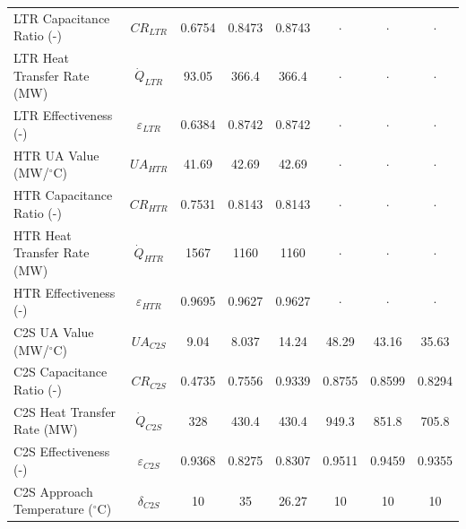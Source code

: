\begin{paracol}{2}
\begin{specialtable}[H]
{\begin{tabular}{lc|c|cc|ccc}
            LTR Capacitance Ratio (-)	&	$CR_{LTR}$	&	0.6754	&	0.8473	&	0.8743	&	$\cdot$	&	$\cdot$	&	$\cdot$	\\
            LTR Heat Transfer Rate (MW)	&	$\dot{Q}_{LTR}$	&	93.05	&	366.4	&	366.4	&	$\cdot$	&	$\cdot$	&	$\cdot$	\\
            LTR Effectiveness (-)	&	$\varepsilon_{LTR}$	&	0.6384	&	0.8742	&	0.8742	&	$\cdot$	&	$\cdot$	&	$\cdot$	\\
            HTR UA Value (MW/$^{\circ}$C)	&	$UA_{HTR}$	&	41.69	&	42.69	&	42.69	&	$\cdot$	&	$\cdot$	&	$\cdot$	\\
            HTR Capacitance Ratio (-)	&	$CR_{HTR}$	&	0.7531	&	0.8143	&	0.8143	&	$\cdot$	&	$\cdot$	&	$\cdot$	\\
            HTR Heat Transfer Rate (MW)	&	$\dot{Q}_{HTR}$	&	1567	&	1160	&	1160	&	$\cdot$	&	$\cdot$	&	$\cdot$	\\
            HTR Effectiveness (-)	&	$\varepsilon_{HTR}$	&	0.9695	&	0.9627	&	0.9627	&	$\cdot$	&	$\cdot$	&	$\cdot$	\\
            C2S UA Value (MW/$^{\circ}$C)	&	$UA_{C2S}$	&	9.04	&	8.037	&	14.24	&	48.29	&	43.16	&	35.63	\\
            C2S Capacitance Ratio (-)	&	$CR_{C2S}$	&	0.4735	&	0.7556	&	0.9339	&	0.8755	&	0.8599	&	0.8294	\\
            C2S Heat Transfer Rate (MW)	&	$\dot{Q}_{C2S}$	&	328	&	430.4	&	430.4	&	949.3	&	851.8	&	705.8	\\
            C2S Effectiveness (-)	&	$\varepsilon_{C2S}$	&	0.9368	&	0.8275	&	0.8307	&	0.9511	&	0.9459	&	0.9355	\\
            C2S Approach Temperature ($^{\circ}$C)	&	$\delta_{C2S}$	&	10	&	35	&	26.27	&	10	&	10	&	10	\\
            \bottomrule
        \end{tabular}
        }
    \end{specialtable}
        

\end{paracol}
